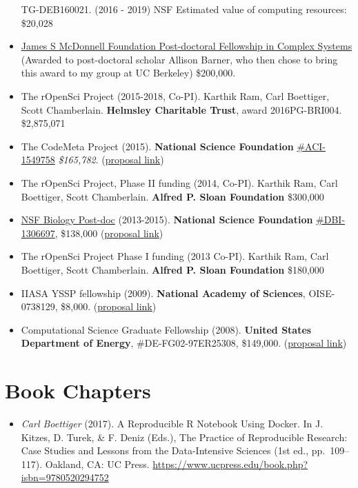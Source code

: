 \documentclass[10pt,sans]{moderncv}        %
\providecommand{\tightlist}{%
    \setlength{\itemsep}{0pt}\setlength{\parskip}{0pt}}
\begin{document}
\begin{itemize}
  TG-DEB160021. (2016 - 2019) NSF Estimated value of computing
  resources: \$20,028
\item
  \href{https://www.jsmf.org/grants/20150024/}{James S McDonnell
  Foundation Post-doctoral Fellowship in Complex Systems} (Awarded to
  post-doctoral scholar Allison Barner, who then chose to bring this
  award to my group at UC Berkeley) \$200,000.
\item
  The rOpenSci Project (2015-2018, Co-PI). Karthik Ram, Carl Boettiger,
  Scott Chamberlain. \textbf{Helmsley Charitable Trust}, award
  2016PG-BRI004. \$2,875,071
\item
  The CodeMeta Project (2015). \textbf{National Science Foundation}
  \href{https://www.nsf.gov/awardsearch/showAward?AWD_ID=1549758}{\#ACI-1549758}
  \emph{\$165,782}.
  (\href{https://dx.doi.org/10.6084/m9.figshare.2055972}{proposal link})
\item
  The rOpenSci Project, Phase II funding (2014, Co-PI). Karthik Ram,
  Carl Boettiger, Scott Chamberlain. \textbf{Alfred P. Sloan Foundation}
  \$300,000
\item
  \href{http://www.nsf.gov/pubs/2012/nsf12497/nsf12497.htm}{NSF Biology
  Post-doc} (2013-2015). \textbf{National Science Foundation}
  \href{http://www.nsf.gov/awardsearch/showAward?AWD_ID=1306697}{\#DBI-1306697},
  \$138,000 (\href{http://doi.org/10.6084/m9.figshare.652970}{proposal
  link})
\item
  The rOpenSci Project Phase I funding (2013 Co-PI). Karthik Ram, Carl
  Boettiger, Scott Chamberlain. \textbf{Alfred P. Sloan Foundation}
  \$180,000
\item
  IIASA YSSP fellowship (2009). \textbf{National Academy of Sciences},
  OISE-0738129, \$8,000.
  (\href{http://doi.org/10.6084/m9.figshare.678310}{proposal link})
\item
  Computational Science Graduate Fellowship (2008). \textbf{United
  States Department of Energy}, \#DE-FG02-97ER25308, \$149,000.
  (\href{https://dx.doi.org/10.6084/m9.figshare.2010246}{proposal link})
\end{itemize}

\hypertarget{book-chapters}{%
\section{Book Chapters}\label{book-chapters}}

\begin{itemize}
\tightlist
\item
  \emph{Carl Boettiger} (2017). A Reproducible R Notebook Using Docker.
  In J. Kitzes, D. Turek, \& F. Deniz (Eds.), The Practice of
  Reproducible Research: Case Studies and Lessons from the
  Data-Intensive Sciences (1st ed., pp.~109--117). Oakland, CA: UC
  Press. \url{https://www.ucpress.edu/book.php?isbn=9780520294752}
\end{itemize}
\end{document}
